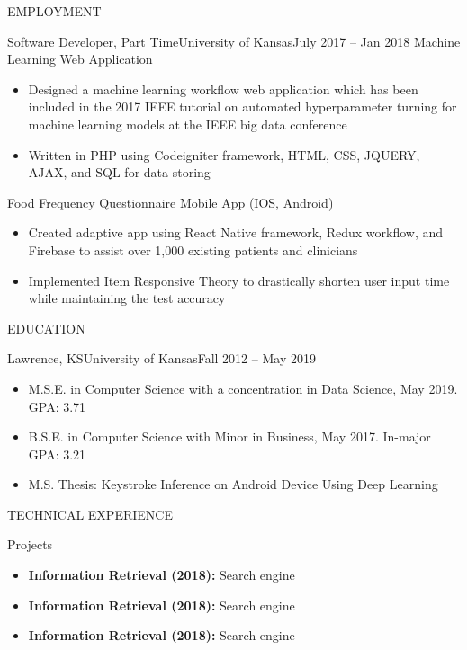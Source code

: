 \documentclass[]{mcdowellcv}
\begin{document}
\begin{cvsection}{EMPLOYMENT}
		\begin{cvsubsection}{Software Developer, Part Time}{University of Kansas}{July 2017 -- Jan 2018}		
			Machine Learning Web Application
			\begin{itemize}
				\item Designed a machine learning workflow web application which has been included in the 2017 IEEE tutorial on automated hyperparameter turning for machine learning models at the IEEE big data conference
				\item Written in PHP using Codeigniter framework, HTML, CSS, JQUERY, AJAX, and SQL for data storing
			\end{itemize}
			Food Frequency Questionnaire Mobile App (IOS, Android)
			\begin{itemize}
				\item Created adaptive app using React Native framework, Redux workflow, and Firebase to assist over 1,000 existing patients and clinicians
				\item Implemented Item Responsive Theory to drastically shorten user input time while maintaining the test accuracy
			\end{itemize}
		\end{cvsubsection}
	\end{cvsection}
	
	\begin{cvsection}{EDUCATION}
		\begin{cvsubsection}{Lawrence, KS}{University of Kansas}{Fall 2012 -- May 2019}
			\begin{itemize}
				\item M.S.E. in Computer Science with a concentration in Data Science, May 2019. GPA: 3.71
				\item B.S.E. in Computer Science with Minor in Business, May 2017. In-major GPA: 3.21
				\item M.S. Thesis: Keystroke Inference on Android Device Using Deep Learning
			\end{itemize}
		\end{cvsubsection}
	\end{cvsection}

	\begin{cvsection}{TECHNICAL EXPERIENCE}
		\begin{cvsubsection}{Projects}{}{}
			\begin{itemize}
				\item \textbf{Information Retrieval (2018):} Search engine
				\item \textbf{Information Retrieval (2018):} Search engine
				\item \textbf{Information Retrieval (2018):} Search engine
			\end{itemize}
		\end{cvsubsection}
	\end{cvsection}
	
\end{document}
